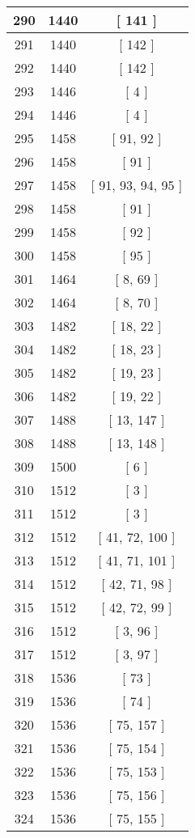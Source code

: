 \begin{center}
\begin{longtable}[H]{|| c c c ||}
\hline
290 & 1440 & [ 141 ] \\ 
\hline
291 & 1440 & [ 142 ] \\ 
\hline
292 & 1440 & [ 142 ] \\ 
\hline
293 & 1446 & [ 4 ] \\ 
\hline
294 & 1446 & [ 4 ] \\ 
\hline
295 & 1458 & [ 91, 92 ] \\ 
\hline
296 & 1458 & [ 91 ] \\ 
\hline
297 & 1458 & [ 91, 93, 94, 95 ] \\ 
\hline
298 & 1458 & [ 91 ] \\ 
\hline
299 & 1458 & [ 92 ] \\ 
\hline
300 & 1458 & [ 95 ] \\ 
\hline
301 & 1464 & [ 8, 69 ] \\ 
\hline
302 & 1464 & [ 8, 70 ] \\ 
\hline
303 & 1482 & [ 18, 22 ] \\ 
\hline
304 & 1482 & [ 18, 23 ] \\ 
\hline
305 & 1482 & [ 19, 23 ] \\ 
\hline
306 & 1482 & [ 19, 22 ] \\ 
\hline
307 & 1488 & [ 13, 147 ] \\ 
\hline
308 & 1488 & [ 13, 148 ] \\ 
\hline
309 & 1500 & [ 6 ] \\ 
\hline
310 & 1512 & [ 3 ] \\ 
\hline
311 & 1512 & [ 3 ] \\ 
\hline
312 & 1512 & [ 41, 72, 100 ] \\ 
\hline
313 & 1512 & [ 41, 71, 101 ] \\ 
\hline
314 & 1512 & [ 42, 71, 98 ] \\ 
\hline
315 & 1512 & [ 42, 72, 99 ] \\ 
\hline
316 & 1512 & [ 3, 96 ] \\ 
\hline
317 & 1512 & [ 3, 97 ] \\ 
\hline
318 & 1536 & [ 73 ] \\ 
\hline
319 & 1536 & [ 74 ] \\ 
\hline
320 & 1536 & [ 75, 157 ] \\ 
\hline
321 & 1536 & [ 75, 154 ] \\ 
\hline
322 & 1536 & [ 75, 153 ] \\ 
\hline
323 & 1536 & [ 75, 156 ] \\ 
\hline
324 & 1536 & [ 75, 155 ] \\ 
\hline

\end{longtable}
\end{center}
